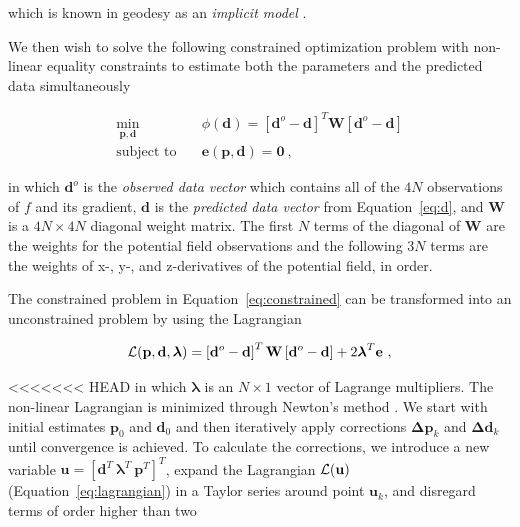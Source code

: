 \noindent
which is known in geodesy as an \textit{implicit model} \citep{Vanicek1986}.

We then wish to solve the following constrained optimization problem with
non-linear equality constraints to estimate both the parameters and the
predicted data simultaneously

\begin{equation}
  \begin{aligned}
    \min_{\mathbf{p}, \mathbf{d}} \quad &
      \phi(\mathbf{d}) =
      \left[\mathbf{d}^o - \mathbf{d}\right]^T \mathbf{W}
      \left[\mathbf{d}^o - \mathbf{d}\right]
    \\
    \textrm{subject to} \quad &
      \mathbf{e}(\mathbf{p}, \mathbf{d}) = \mathbf{0}
    \ ,
  \end{aligned}
  \label{eq:constrained}
\end{equation}

\noindent
in which $\mathbf{d}^o$ is the \textit{observed data vector} which contains all
of the $4N$ observations of $f$ and its gradient,
$\mathbf{d}$ is the \textit{predicted data vector} from Equation~\ref{eq:d},
and $\mathbf{W}$ is a $4N \times 4N$ diagonal weight matrix.
The first $N$ terms of the diagonal of $\mathbf{W}$ are the weights for the
potential field observations and the following $3N$ terms are the weights of
x-, y-, and z-derivatives of the potential field, in order.

The constrained problem in Equation~\ref{eq:constrained} can be transformed
into an unconstrained problem by using the Lagrangian

\begin{equation}
  \operatorname{\mathcal{L}}(\mathbf{p}, \mathbf{d}, \boldsymbol{\lambda}) =
    \left[\mathbf{d}^o - \mathbf{d}\right]^T \mathbf{W}
    \left[\mathbf{d}^o - \mathbf{d}\right]
    +
    2 \boldsymbol{\lambda}^T \mathbf{e}
  \ ,
  \label{eq:lagrangian}
\end{equation}

\noindent
<<<<<<< HEAD
in which $\boldsymbol{\lambda}$ is an $N \times 1$ vector of Lagrange
multipliers.
The non-linear Lagrangian is minimized through Newton's method
\citep{Aster2018}.
We start with initial estimates $\mathbf{p}_0$ and $\mathbf{d}_0$ and then
iteratively apply corrections $\mathbf{\Delta p}_k$ and $\mathbf{\Delta d}_k$
until convergence is achieved.
To calculate the corrections, we introduce a new variable $\mathbf{u} =
[\mathbf{d}^T\  \boldsymbol{\lambda}^T \ \mathbf{p}^T]^T$, expand the
Lagrangian $\operatorname{\mathcal{L}}(\mathbf{u})$ (Equation~\ref{eq:lagrangian}) in a Taylor
series around point $\mathbf{u}_k$, and disregard terms of order higher than
two

